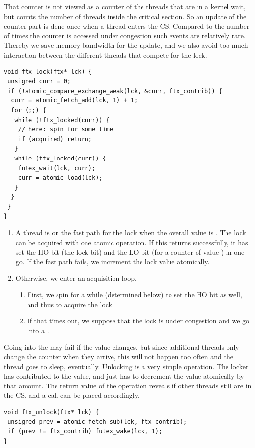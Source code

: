 That counter is not viewed as a counter of the threads that are in
a kernel wait, but counts the number of threads inside the critical
section.  So an update of the counter part is done once when a
thread enters the CS.
\iflong%
Compared to the number of times
the counter is accessed under congestion such events are relatively
rare. Thereby we save memory bandwidth for the update, and we also
avoid too much interaction between the different threads that
compete for the lock.
\fi
\lstset{language=C11,label= ,caption= ,numbers=none}
\begin{lstlisting}
void ftx_lock(ftx* lck) {
 unsigned curr = 0;
 if (!atomic_compare_exchange_weak(lck, &curr, ftx_contrib)) {
  curr = atomic_fetch_add(lck, 1) + 1;
  for (;;) {
   while (!ftx_locked(curr)) {
    // here: spin for some time
    if (acquired) return;
   }
   while (ftx_locked(curr)) {
    futex_wait(lck, curr);
    curr = atomic_load(lck);
   }
  }
 }
}
\end{lstlisting}

\begin{enumerate}
\item A thread is on the fast path for the lock when the overall value
is . The lock can be acquired with one atomic operation.
\iflong%
If
this returns successfully, it has set the HO bit (the lock bit)
and the LO bit (for a counter of value ) in one go. If the
fast path fails, we increment the lock value atomically.
\fi
\itemadjust
\item Otherwise, we enter an acquisition loop.\itemadjust
\begin{enumerate}
\item First, we spin for a while
\iflong%
(determined below) to set the HO
bit as well, and thus
\else%
to
\fi%
acquire the lock.
\item If that times out,
\iflong%
we suppose that the lock is under congestion and
\fi%
we go into a .
\itemadjust
\end{enumerate}
\end{enumerate}
\iflong%
Going into the  may fail if the value changes, but
since additional threads only change the counter when they arrive,
this will not happen too often and the thread goes to sleep,
eventually.
\fi%
Unlocking is a very simple operation. The locker has contributed
 to the value, and just has to decrement the value
atomically by that amount.  The return value of the operation
reveals if other threads still are in the CS, and a
 call can be placed accordingly.
\iflong%
\lstset{language=C11,label= ,caption= ,numbers=none}
\begin{lstlisting}
void ftx_unlock(ftx* lck) {
 unsigned prev = atomic_fetch_sub(lck, ftx_contrib);
 if (prev != ftx_contrib) futex_wake(lck, 1);
}
\end{lstlisting}
\fi

